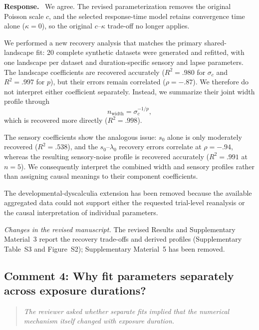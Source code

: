 \documentclass[11pt]{article}
\newenvironment{reviewercomment}{\begin{quote}\color{reviewgray}\itshape}{\end{quote}}
\newenvironment{authorresponse}{\par\noindent\textbf{\color{responseblue}Response.}\ }{\par}
\newcommand{\change}[1]{\par\noindent\textit{Changes in the revised manuscript.} #1\par}
\begin{document}
\begin{authorresponse}
We agree. The revised parameterization removes the original Poisson scale $c$, and the selected response-time model retains convergence time alone ($\kappa=0$), so the original $c$--$\kappa$ trade-off no longer applies.

We performed a new recovery analysis that matches the primary shared-landscape fit: 20 complete synthetic datasets were generated and refitted, with one landscape per dataset and duration-specific sensory and lapse parameters. The landscape coefficients are recovered accurately ($R^2=.980$ for $\sigma_c$ and $R^2=.997$ for $p$), but their errors remain correlated ($\rho=-.87$). We therefore do not interpret either coefficient separately. Instead, we summarize their joint width profile through
\[
n_{\mathrm{width}}=\sigma_c^{-1/p},
\]
which is recovered more directly ($R^2=.998$).

The sensory coefficients show the analogous issue: $s_0$ alone is only moderately recovered ($R^2=.538$), and the $s_0$--$\lambda_0$ recovery errors correlate at $\rho=-.94$, whereas the resulting sensory-noise profile is recovered accurately ($R^2=.991$ at $n=5$). We consequently interpret the combined width and sensory profiles rather than assigning causal meanings to their component coefficients.

The developmental-dyscalculia extension has been removed because the available aggregated data could not support either the requested trial-level reanalysis or the causal interpretation of individual parameters.
\end{authorresponse}

\change{The revised Results and Supplementary Material~3 report the recovery trade-offs and derived profiles (Supplementary Table~S3 and Figure~S2); Supplementary Material~5 has been removed.}

\subsection*{Comment 4: Why fit parameters separately across exposure durations?}

\begin{reviewercomment}
The reviewer asked whether separate fits implied that the numerical mechanism itself changed with exposure duration.
\end{reviewercomment}
\end{document}
